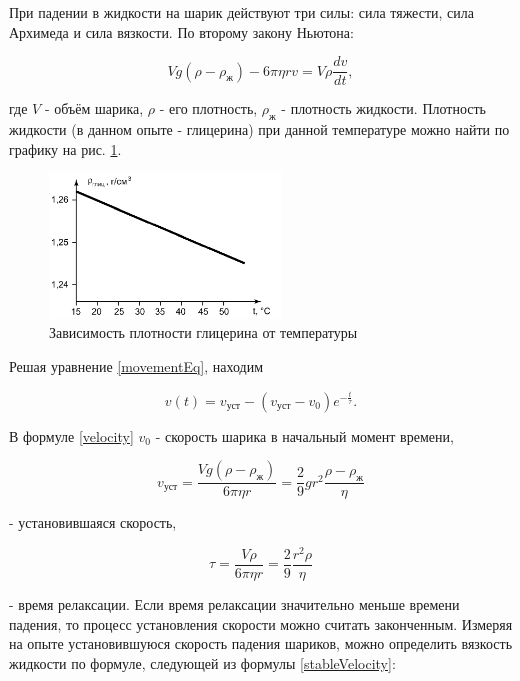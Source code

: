 \documentclass[a4paper,12pt]{article} %
\begin{document}
При падении в жидкости на шарик действуют три силы: сила тяжести, сила Архимеда и сила вязкости. По второму закону Ньютона:

\begin{equation}
    Vg(\rho - \rho_\text{ж}) - 6\pi\eta rv = V\rho\frac{dv}{dt},
    \label{movementEq}
\end{equation}

где $V$ - объём шарика, $\rho$ - его плотность, $\rho_\text{ж}$ - плотность жидкости. Плотность жидкости (в данном опыте - глицерина) при данной температуре можно найти по графику на рис. \ref{fig:graph}.

\begin{figure}
    \centering
    \includegraphics[width = 0.55\textwidth]{graph.PNG}
    \caption{Зависимость плотности глицерина от температуры}
    \label{fig:graph}
\end{figure}

Решая уравнение \eqref{movementEq}, находим

\begin{equation}
    v(t) = v_\text{уст} - (v_\text{уст} - v_0)e^{-\frac{t}{\tau}}.
    \label{velocity}
\end{equation}

В формуле \eqref{velocity} $v_0$ - скорость шарика в начальный момент времени,

\begin{equation}
    v_\text{уст} = \frac{Vg(\rho - \rho_\text{ж})}{6\pi\eta r} = \frac{2}{9}gr^2\frac{\rho - \rho_\text{ж}}{\eta}
    \label{stableVelocity}
\end{equation}

- установившаяся скорость,

\begin{equation}
    \tau = \frac{V\rho}{6\pi\eta r} = \frac{2}{9} \frac{r^2\rho}{\eta}
\end{equation}

- время релаксации. Если время релаксации значительно меньше времени падения, то процесс установления скорости можно считать законченным. Измеряя на опыте установившуюся скорость падения шариков, можно определить вязкость жидкости по формуле, следующей из формулы \eqref{stableVelocity}:
\end{document}
